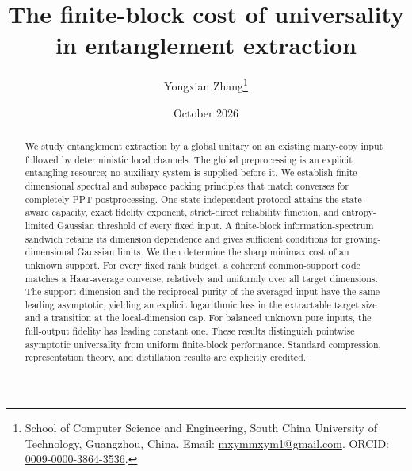 \documentclass[12pt,letterpaper]{article}
\title{The finite-block cost of universality\\in entanglement extraction}
\author{Yongxian Zhang\thanks{School of Computer Science and Engineering, South China University of Technology, Guangzhou, China. Email: \href{mailto:mxymmxym1@gmail.com}{mxymmxym1@gmail.com}. ORCID: \href{https://orcid.org/0009-0000-3864-3536}{0009-0000-3864-3536}.}}
\date{October 2026}
\theoremstyle{definition}\newtheorem{definition}[theorem]{Definition}
\theoremstyle{remark}\newtheorem{remark}[theorem]{Remark}
\begin{document}
\maketitle
\begin{abstract}
We study entanglement extraction by a global unitary on an existing many-copy input followed by deterministic local channels. The global preprocessing is an explicit entangling resource; no auxiliary system is supplied before it. We establish finite-dimensional spectral and subspace packing principles that match converses for completely PPT postprocessing. One state-independent protocol attains the state-aware capacity, exact fidelity exponent, strict-direct reliability function, and entropy-limited Gaussian threshold of every fixed input. A finite-block information-spectrum sandwich retains its dimension dependence and gives sufficient conditions for growing-dimensional Gaussian limits. We then determine the sharp minimax cost of an unknown support. For every fixed rank budget, a coherent common-support code matches a Haar-average converse, relatively and uniformly over all target dimensions. The support dimension and the reciprocal purity of the averaged input have the same leading asymptotic, yielding an explicit logarithmic loss in the extractable target size and a transition at the local-dimension cap. For balanced unknown pure inputs, the full-output fidelity has leading constant one. These results distinguish pointwise asymptotic universality from uniform finite-block performance. Standard compression, representation theory, and distillation results are explicitly credited.
\end{abstract}








\end{document}
